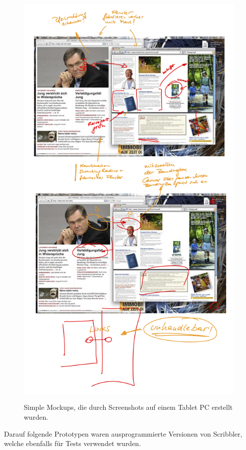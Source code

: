 \begin{figure}
	        {\includegraphics[width=1\linewidth]{gfx/scribblerMockups}}
		\caption[Mockups in Scribbler]{Simple Mockups, die durch Screenshots auf einem Tablet PC erstellt wurden.}\label{fig:scribblerMockups}
\end{figure}

\medskip Darauf folgende Prototypen waren ausprogrammierte Versionen von Scribbler, welche ebenfalls für Tests verwendet wurden.

